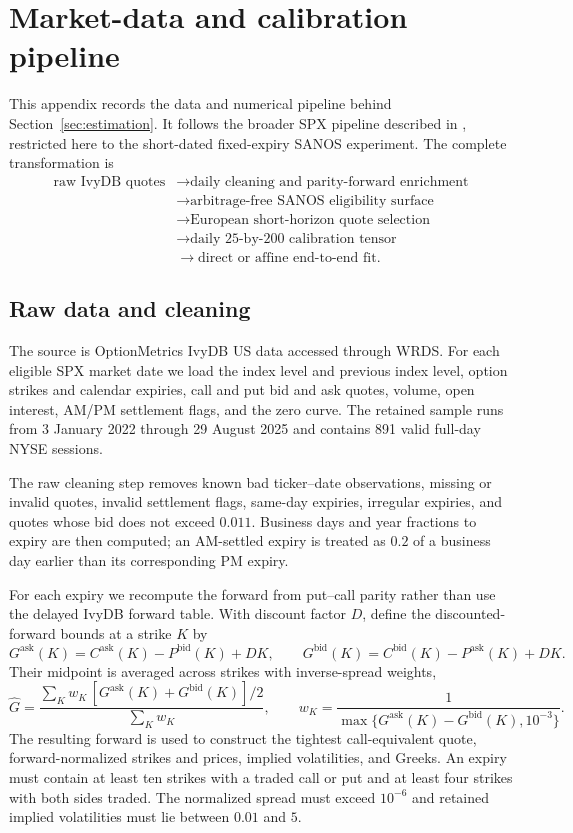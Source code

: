 \section{Market-data and calibration pipeline}
\label{app:market-pipeline}

This appendix records the data and numerical pipeline behind
Section~\ref{sec:estimation}. It follows the broader SPX pipeline described in
\citet{DYSANOS2026}, restricted here to the short-dated fixed-expiry SANOS
experiment. The complete transformation is
\[
\begin{aligned}
\text{raw IvyDB quotes}
&\longrightarrow \text{daily cleaning and parity-forward enrichment}\\
&\longrightarrow \text{arbitrage-free SANOS eligibility surface}\\
&\longrightarrow \text{European short-horizon quote selection}\\
&\longrightarrow \text{daily 25-by-200 calibration tensor}\\
&\longrightarrow \text{direct or affine end-to-end fit}.
\end{aligned}
\]

\subsection{Raw data and cleaning}
\label{app:pipeline-raw}

The source is OptionMetrics IvyDB US data accessed through WRDS. For each
eligible SPX market date we load the index level and previous index level,
option strikes and calendar expiries, call and put bid and ask quotes, volume,
open interest, AM/PM settlement flags, and the zero curve. The retained sample
runs from 3 January 2022 through 29 August 2025 and contains 891 valid full-day
NYSE sessions.

The raw cleaning step removes known bad ticker--date observations, missing or
invalid quotes, invalid settlement flags, same-day expiries, irregular
expiries, and quotes whose bid does not exceed $0.011$. Business days and year
fractions to expiry are then computed; an AM-settled expiry is treated as
$0.2$ of a business day earlier than its corresponding PM expiry.

For each expiry we recompute the forward from put--call parity rather than use
the delayed IvyDB forward table. With discount factor $D$, define the
discounted-forward bounds at a strike $K$ by
\[
  G^{\mathrm{ask}}(K)=C^{\mathrm{ask}}(K)-P^{\mathrm{bid}}(K)+DK,
  \qquad
  G^{\mathrm{bid}}(K)=C^{\mathrm{bid}}(K)-P^{\mathrm{ask}}(K)+DK.
\]
Their midpoint is averaged across strikes with inverse-spread weights,
\[
  \widehat G
  =\frac{\sum_K w_K\,[G^{\mathrm{ask}}(K)+G^{\mathrm{bid}}(K)]/2}
         {\sum_K w_K},
  \qquad
  w_K=\frac1{\max\{G^{\mathrm{ask}}(K)-G^{\mathrm{bid}}(K),10^{-3}\}}.
\]
The resulting forward is used to construct the tightest call-equivalent quote,
forward-normalized strikes and prices, implied volatilities, and Greeks. An
expiry must contain at least ten strikes with a traded call or put and at least
four strikes with both sides traded. The normalized spread must exceed
$10^{-6}$ and retained implied volatilities must lie between $0.01$ and $5$.

